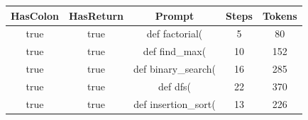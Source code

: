 \begin{table}[h]
\centering
\begin{tabular}{ |c|c|c|c|c| }
\hline
HasColon & HasReturn & Prompt & Steps & Tokens \\
\hline
true & true & def factorial( & 5 & 80 \\
\hline
true & true & def find\_max( & 10 & 152 \\
\hline
true & true & def binary\_search( & 16 & 285 \\
\hline
true & true & def dfs( & 22 & 370 \\
\hline
true & true & def insertion\_sort( & 13 & 226 \\
\hline
\end{tabular}
\end{table}
